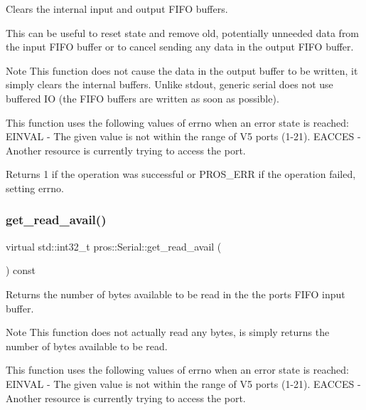 Clears the internal input and output F\+I\+FO buffers. 

This can be useful to reset state and remove old, potentially unneeded data from the input F\+I\+FO buffer or to cancel sending any data in the output F\+I\+FO buffer.

\begin{DoxyNote}{Note}
This function does not cause the data in the output buffer to be written, it simply clears the internal buffers. Unlike stdout, generic serial does not use buffered IO (the F\+I\+FO buffers are written as soon as possible).
\end{DoxyNote}
This function uses the following values of errno when an error state is reached\+: E\+I\+N\+V\+AL -\/ The given value is not within the range of V5 ports (1-\/21). E\+A\+C\+C\+ES -\/ Another resource is currently trying to access the port.

\begin{DoxyReturn}{Returns}
1 if the operation was successful or P\+R\+O\+S\+\_\+\+E\+RR if the operation failed, setting errno. 
\end{DoxyReturn}
\mbox{\label{classpros_1_1Serial_aca502997319088ea71cf870fbbca7eb8}} 
\subsubsection{\texorpdfstring{get\+\_\+read\+\_\+avail()}{get\_read\_avail()}}
{\footnotesize\ttfamily virtual std\+::int32\+\_\+t pros\+::\+Serial\+::get\+\_\+read\+\_\+avail (\begin{DoxyParamCaption}{ }\end{DoxyParamCaption}) const\hspace{0.3cm}{\ttfamily [virtual]}}



Returns the number of bytes available to be read in the the port\textquotesingle{}s F\+I\+FO input buffer. 

\begin{DoxyNote}{Note}
This function does not actually read any bytes, is simply returns the number of bytes available to be read.
\end{DoxyNote}
This function uses the following values of errno when an error state is reached\+: E\+I\+N\+V\+AL -\/ The given value is not within the range of V5 ports (1-\/21). E\+A\+C\+C\+ES -\/ Another resource is currently trying to access the port.

